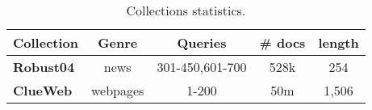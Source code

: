 \begin{table}
\centering
\caption{Collections statistics.}
\begin{tabularx}{\linewidth}{Xcccc} 
\toprule
\bf Collection & \bf Genre & \bf Queries & \bf \# docs & \bf length  \\ %
\midrule
\bf Robust04 & news  & 301-450,601-700 & 528k & 254  \\ %
\bf ClueWeb & webpages & 1-200 & 50m & 1,506  \\ 
\bottomrule
\end{tabularx}
\label{tab:data}
\end{table}